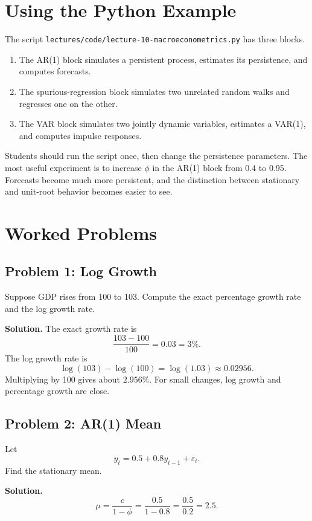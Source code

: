 \section{Using the Python Example}

The script \texttt{lectures/code/lecture-10-macroeconometrics.py} has three blocks.

\begin{enumerate}
    \item The AR(1) block simulates a persistent process, estimates its persistence, and computes forecasts.
    \item The spurious-regression block simulates two unrelated random walks and regresses one on the other.
    \item The VAR block simulates two jointly dynamic variables, estimates a VAR(1), and computes impulse responses.
\end{enumerate}

Students should run the script once, then change the persistence parameters. The most useful experiment is to increase \(\phi\) in the AR(1) block from 0.4 to 0.95. Forecasts become much more persistent, and the distinction between stationary and unit-root behavior becomes easier to see.

\section{Worked Problems}

\subsection*{Problem 1: Log Growth}

Suppose GDP rises from 100 to 103. Compute the exact percentage growth rate and the log growth rate.

\textbf{Solution.} The exact growth rate is
\[
    \frac{103-100}{100}=0.03=3\%.
\]
The log growth rate is
\[
    \log(103)-\log(100)=\log(1.03)\approx 0.02956.
\]
Multiplying by 100 gives about \(2.956\%\). For small changes, log growth and percentage growth are close.

\subsection*{Problem 2: AR(1) Mean}

Let
\[
    y_t=0.5+0.8y_{t-1}+\varepsilon_t.
\]
Find the stationary mean.

\textbf{Solution.}
\[
    \mu=\frac{c}{1-\phi}
    =
    \frac{0.5}{1-0.8}
    =
    \frac{0.5}{0.2}
    =
    2.5.
\]


